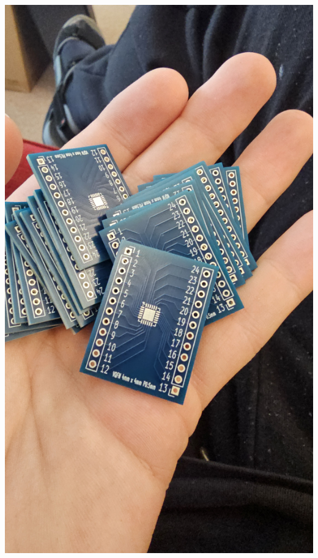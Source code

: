 \documentclass[11pt,a4paper,titlepage]{report}
\begin{document}
	\begin{center}
		\label{picture:breakout_1}
		\includegraphics[width=\linewidth]{assets/BREAKOUT1.jpg}
	\end{center}
\end{document}
